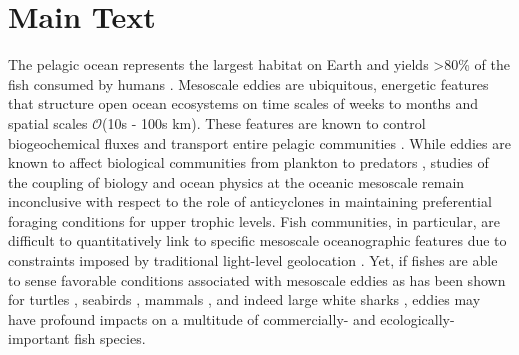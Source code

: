 \clearpage
\section{Main Text} 

The pelagic ocean represents the largest habitat on Earth \citep[99\% of the biosphere][]{Game2009} and yields >80\% of the fish consumed by humans \citep{Game2009,Pauly2002}. Mesoscale eddies are ubiquitous, energetic features that structure open ocean ecosystems \citep{McGillicuddy2016} on time scales of weeks to months and spatial scales $\mathcal{O}$(10s - 100s km). These features are known to control biogeochemical fluxes and transport entire pelagic communities \citep{Chelton2011}. While eddies are known to affect biological communities from plankton \citep{McGillicuddy2007, benitez2007mesoscale} to predators \citep{Bailleul2010,Gaube2018}, studies of the coupling of biology and ocean physics at the oceanic mesoscale remain inconclusive with respect to the role of anticyclones in maintaining preferential foraging conditions for upper trophic levels. Fish communities, in particular, are difficult to quantitatively link to specific mesoscale oceanographic features due to constraints imposed by traditional light-level geolocation \citep[][Chapter \ref{chap:2}]{Braun2018a}. Yet, if fishes are able to sense favorable conditions associated with mesoscale eddies as has been shown for turtles \citep{Gaube2017, Kobayashi2011}, seabirds \citep{TewKai2009}, mammals \citep{Bailleul2010}, and indeed large white sharks \citep{Gaube2018}, eddies may have profound impacts on a multitude of commercially- and ecologically-important fish species.


